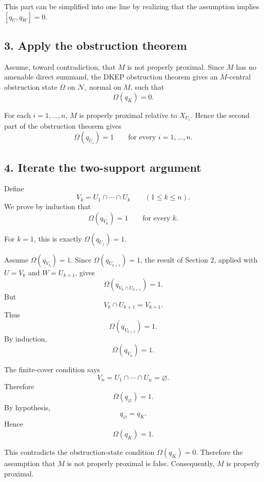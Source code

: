 \documentclass[12pt]{article}
\newcommand{\review}[1]{\begin{reviewbox}#1\end{reviewbox}}
\begin{document}
\review{This part can be simplified into one line by realizing that the assumption implies $[q_U,q_W]=0$.}

\subsection*{3. Apply the obstruction theorem}

Assume, toward contradiction, that \(M\) is not properly proximal. Since \(M\) has no amenable direct summand, the DKEP obstruction theorem gives an \(M\)-central obstruction state \(\Omega\) on \(\mathcal N\), normal on \(M\), such that
\[
\Omega(q_K)=0.
\]

For each \(i=1,\dots,n\), \(M\) is properly proximal relative to \(X_{U_i}\). Hence the second part of the obstruction theorem gives
\[
\Omega(q_{U_i})=1
\qquad\text{for every }i=1,\dots,n.
\]

\subsection*{4. Iterate the two-support argument}

Define
\[
V_k=U_1\cap\cdots\cap U_k
\qquad (1\le k\le n).
\]
We prove by induction that
\[
\Omega(q_{V_k})=1
\qquad\text{for every }k.
\]

For \(k=1\), this is exactly \(\Omega(q_{U_1})=1\).

Assume \(\Omega(q_{V_k})=1\). Since \(\Omega(q_{U_{k+1}})=1\), the result of Section 2, applied with \(U=V_k\) and \(W=U_{k+1}\), gives
\[
\Omega(q_{V_k\cap U_{k+1}})=1.
\]
But
\[
V_k\cap U_{k+1}=V_{k+1}.
\]
Thus
\[
\Omega(q_{V_{k+1}})=1.
\]
By induction,
\[
\Omega(q_{V_n})=1.
\]

The finite-cover condition says
\[
V_n=U_1\cap\cdots\cap U_n=\varnothing.
\]
Therefore
\[
\Omega(q_{\varnothing})=1.
\]
By hypothesis,
\[
q_{\varnothing}=q_K.
\]
Hence
\[
\Omega(q_K)=1.
\]

This contradicts the obstruction-state condition \(\Omega(q_K)=0\). Therefore the assumption that \(M\) is not properly proximal is false. Consequently, \(M\) is properly proximal.
\end{document}
